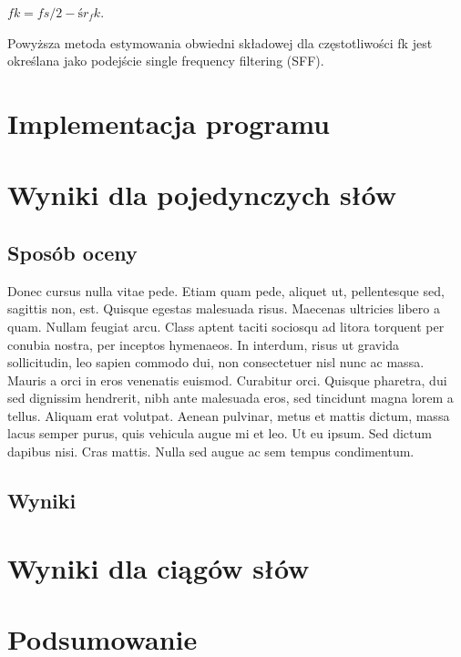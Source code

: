 \documentclass[eng,printmode]{mgr}
\begin{document}
 $fk = fs/2 - śr_fk.$
 
 
 Powyższa metoda estymowania obwiedni składowej dla częstotliwości fk jest określana jako podejście single frequency filtering (SFF). 
 

\chapter{Implementacja programu}

\chapter{Wyniki dla pojedynczych słów}
 \section{Sposób oceny}
Donec cursus nulla vitae pede. Etiam quam pede, aliquet ut, pellentesque sed, sagittis non, est. Quisque egestas malesuada risus. Maecenas ultricies libero a quam. Nullam feugiat arcu. Class aptent taciti sociosqu ad litora torquent per conubia nostra, per inceptos hymenaeos. In interdum, risus ut gravida sollicitudin, leo sapien commodo dui, non consectetuer nisl nunc ac massa. Mauris a orci in eros venenatis euismod. Curabitur orci. Quisque pharetra, dui sed dignissim hendrerit, nibh ante malesuada eros, sed tincidunt magna lorem a tellus. Aliquam erat volutpat. Aenean pulvinar, metus et mattis dictum, massa lacus semper purus, quis vehicula augue mi et leo. Ut eu ipsum. Sed dictum dapibus nisi. Cras mattis. Nulla sed augue ac sem tempus condimentum. 
 \section{Wyniki}

\chapter{Wyniki dla ciągów słów}

\chapter{Podsumowanie}

%


 \listoffigures
 \listoftables
\end{document}
